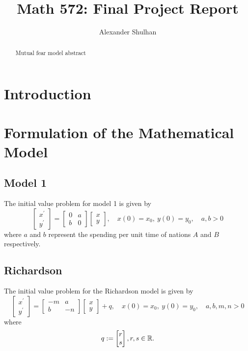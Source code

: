 \documentclass[12pt]{article}
\title{Math 572: Final Project Report}
\author{Alexander Shulhan}
\begin{document}
\maketitle

\begin{abstract}
  Mutual fear model abstract
\end{abstract}
\section{Introduction}
\cite{richardson1960arms}
\section{Formulation of the Mathematical Model}
\subsection{Model 1}
The initial value problem for model 1 is given by
\begin{equation}\label{model1}
  \begin{bmatrix}
    x^{\prime}\\
    y^{\prime}
  \end{bmatrix} = 
  \begin{bmatrix}
    0 & a \\
    b & 0 
    \end{bmatrix}
    \begin{bmatrix}
      x \\ 
      y
  \end{bmatrix},\quad x(0)=x_0,~y(0)=y_0,\quad a,b>0
\end{equation}
where $a$ and $b$ represent the spending per unit time of nations $A$ and $B$ respectively.
\subsection{Richardson}
The initial value problem for the Richardson model is given by
\begin{equation}\label{richardson}
  \begin{bmatrix}
    x^{\prime}\\
    y^{\prime}
  \end{bmatrix} = 
  \begin{bmatrix}
    -m & a \\
    b & -n 
    \end{bmatrix}
    \begin{bmatrix}
      x \\ 
      y
  \end{bmatrix}+q,\quad x(0)=x_0,~y(0)=y_0,\quad a,b,m,n>0
\end{equation}
where 
\[
  q:=\begin{bmatrix}r\\ s\end{bmatrix},r,s\in\mathbb{R}.
\]
\end{document}
